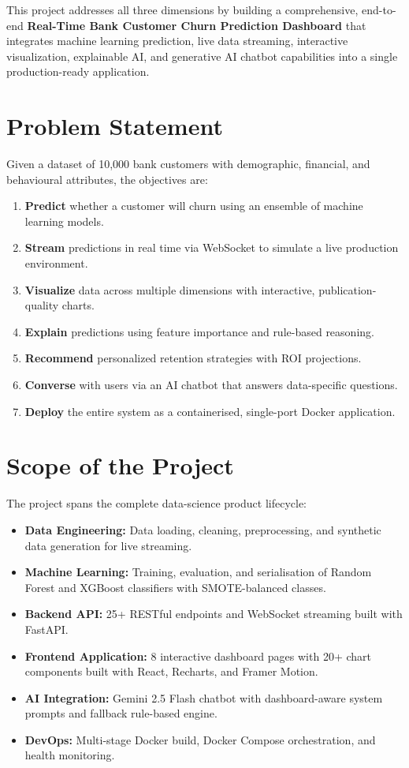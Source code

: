 \documentclass[12pt, a4paper]{report}
\begin{document}
This project addresses all three dimensions by building a comprehensive, end-to-end \textbf{Real-Time Bank Customer Churn Prediction Dashboard} that integrates machine learning prediction, live data streaming, interactive visualization, explainable AI, and generative AI chatbot capabilities into a single production-ready application.

\section{Problem Statement}

Given a dataset of 10,000 bank customers with demographic, financial, and behavioural attributes, the objectives are:

\begin{enumerate}[label=\arabic*.]
    \item \textbf{Predict} whether a customer will churn using an ensemble of machine learning models.
    \item \textbf{Stream} predictions in real time via WebSocket to simulate a live production environment.
    \item \textbf{Visualize} data across multiple dimensions with interactive, publication-quality charts.
    \item \textbf{Explain} predictions using feature importance and rule-based reasoning.
    \item \textbf{Recommend} personalized retention strategies with ROI projections.
    \item \textbf{Converse} with users via an AI chatbot that answers data-specific questions.
    \item \textbf{Deploy} the entire system as a containerised, single-port Docker application.
\end{enumerate}

\section{Scope of the Project}

The project spans the complete data-science product lifecycle:

\begin{itemize}
    \item \textbf{Data Engineering:} Data loading, cleaning, preprocessing, and synthetic data generation for live streaming.
    \item \textbf{Machine Learning:} Training, evaluation, and serialisation of Random Forest and XGBoost classifiers with SMOTE-balanced classes.
    \item \textbf{Backend API:} 25+ RESTful endpoints and WebSocket streaming built with FastAPI.
    \item \textbf{Frontend Application:} 8 interactive dashboard pages with 20+ chart components built with React, Recharts, and Framer Motion.
    \item \textbf{AI Integration:} Gemini 2.5 Flash chatbot with dashboard-aware system prompts and fallback rule-based engine.
    \item \textbf{DevOps:} Multi-stage Docker build, Docker Compose orchestration, and health monitoring.
\end{itemize}
\end{document}
